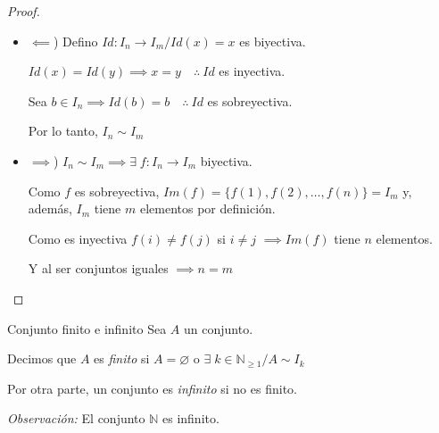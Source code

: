 \begin{proof}\phantom{.}

    \begin{itemize}
        \item $\impliedby$) 
            Defino $Id : I_n \to I_m / Id(x) = x$ es biyectiva.
            
            $Id(x) = Id(y) \implies x = y \quad \therefore ~ Id$ es inyectiva.
            
            Sea $b \in I_n \implies Id(b) = b \quad \therefore ~ Id$ es 
            sobreyectiva.

            Por lo tanto, $I_n \sim I_m$

        \item $\implies$) $I_n \sim I_m \implies \exists \; f: I_n \to I_m$
            biyectiva.

            Como $f$ es sobreyectiva,
            $Im(f) = \{ f(1), f(2), \dotsc, f(n) \} = I_m$ y, además, 
            $I_m$ tiene $m$ elementos por definición.

            Como es inyectiva $f(i) \neq f(j)$ si $i \neq j$ $\implies Im(f)$
            tiene $n$ elementos.

            Y al ser conjuntos iguales $\implies n = m$
    \end{itemize}
\end{proof}


\begin{definicion}{Conjunto finito e infinito}{}
    Sea $A$ un conjunto.

    \medskip

    Decimos que $A$ es \textit{finito} si $A = \varnothing$ o 
    $\exists \; k \in \mathbb{N}_{\geq 1} / A \sim I_k$

    Por otra parte, un conjunto es \textit{infinito} si no es finito.
\end{definicion}

\bigskip
\textit{Observación:} 
El conjunto $\mathbb{N}$ es infinito.

